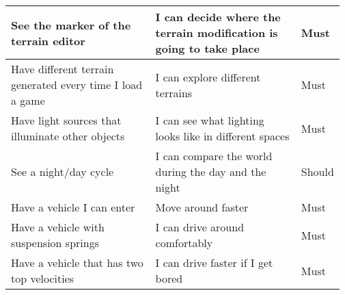 \documentclass[12pt]{article}
\begin{document}
\begin{table}[H]
\begin{tabular}{p{0.45\linewidth}|p{0.45\linewidth}|p{0.07\linewidth}}
		See the marker of the terrain editor                      & I can decide where the terrain modification is going to take place & Must           \\ \hline
		Have different terrain generated every time I load a game & I can explore different terrains                                   & Must           \\ \hline
		Have light sources that illuminate other objects          & I can see what lighting looks like in different spaces             & Must           \\ \hline
		See a night/day cycle                                     & I can compare the world during the day and the night               & Should         \\ \hline
		Have a vehicle I can enter                                & Move around faster                                                 & Must           \\ \hline
		Have a vehicle with suspension springs                    & I can drive around comfortably                                     & Must           \\ \hline
		Have a vehicle that has two top velocities                & I can drive faster if I get bored                                  & Must           \\ \hline


\end{tabular}
\end{table}
\end{document}
